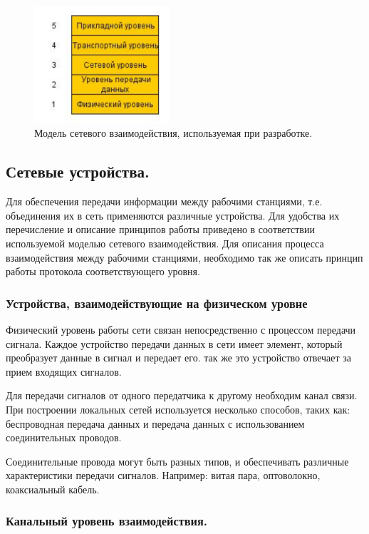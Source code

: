 \documentclass[12pt]{report}
\begin{document}
    \begin{figure}\center
        \includegraphics[width = 50mm]{Ch2Pic4}
        \caption{Модель сетевого взаимодействия, используемая при разработке.} \label{Pic4}
    \end{figure}

    \subsection{Сетевые устройства. }

    Для обеспечения передачи информации между рабочими станциями, т.е. объединения их в сеть применяются различные устройства. Для удобства их перечисление и описание принципов работы приведено в соответствии используемой моделью сетевого взаимодействия. Для описания процесса взаимодействия между рабочими станциями, необходимо так же описать принцип работы протокола соответствующего уровня.

    \subsubsection{Устройства, взаимодействующие на физическом уровне}

    Физический уровень работы сети связан непосредственно с процессом передачи сигнала. Каждое устройство передачи данных в сети имеет элемент, который преобразует данные в сигнал и передает его. так же это устройство отвечает за прием входящих сигналов.

    Для передачи сигналов от одного передатчика к другому необходим канал связи. При построении локальных сетей используется несколько способов, таких как: беспроводная передача данных и передача данных с использованием соединительных проводов.

    Соединительные провода могут быть разных типов, и обеспечивать различные характеристики передачи сигналов. Например: витая пара, оптоволокно, коаксиальный кабель.

    \subsubsection{Канальный уровень взаимодействия. }
\end{document}
